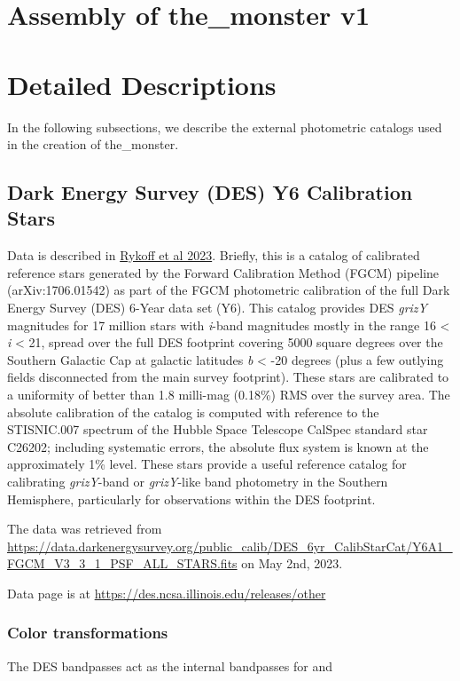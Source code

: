 \section{Assembly of the\_monster v1}
\label{sec:assembly}



\section{Detailed Descriptions}
\label{sec:details}
In the following subsections, we describe the external photometric catalogs used in the creation of the\_monster.

\subsection{Dark Energy Survey (DES) Y6 Calibration Stars}
\label{sec:des}
Data is described in \href{https://arxiv.org/abs/2305.01695}{Rykoff et al 2023}. Briefly, this is a catalog of calibrated reference stars generated by the Forward Calibration Method (FGCM) pipeline (arXiv:1706.01542) as part of the FGCM photometric calibration of the full Dark Energy Survey (DES) 6-Year data set (Y6). This catalog provides DES \textit{grizY} magnitudes for 17 million stars with \textit{i}-band magnitudes mostly in the range 16 < \textit{i} < 21, spread over the full DES footprint covering 5000 square degrees over the Southern Galactic Cap at galactic latitudes \textit{b} < -20 degrees (plus a few outlying fields disconnected from the main survey footprint). These stars are calibrated to a uniformity of better than 1.8 milli-mag (0.18\%) RMS over the survey area. The absolute calibration of the catalog is computed with reference to the STISNIC.007 spectrum of the Hubble Space Telescope CalSpec standard star C26202; including systematic errors, the absolute flux system is known at the approximately 1\% level. These stars provide a useful reference catalog for calibrating \textit{grizY}-band or \textit{grizY}-like band photometry in the Southern Hemisphere, particularly for observations within the DES footprint.

The data was retrieved from \url{https://data.darkenergysurvey.org/public_calib/DES_6yr_CalibStarCat/Y6A1_FGCM_V3_3_1_PSF_ALL_STARS.fits} on May 2nd, 2023.

Data page is at \url{https://des.ncsa.illinois.edu/releases/other}

\subsubsection{Color transformations}
The DES bandpasses act as the internal bandpasses for \monster and 

